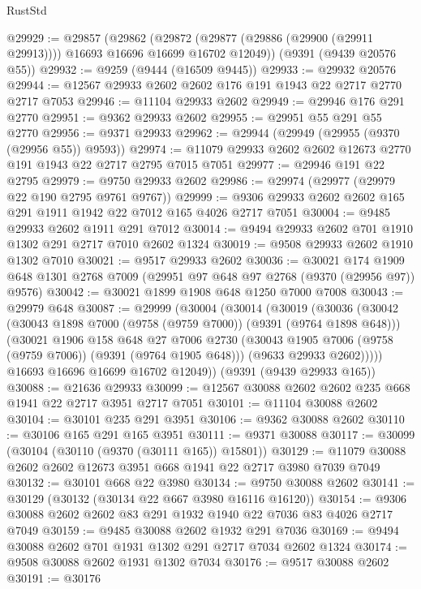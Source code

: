 \begin{lexlean}{RustStd}
\begin{coremodule}
@29929 := @29857
    (@29862 (@29872 (@29877 (@29886 (@29900 (@29911 @29913)))) @16693 @16696 @16699 @16702 @12049))
    (@9391 (@9439 @20576 @55))
@29932 := @9259 (@9444 (@16509 @9445))
@29933 := @29932 @20576
@29944 := @12567 @29933 @2602 @2602 @176 @191 @1943 @22 @2717 @2770 @2717 @7053
@29946 := @11104 @29933 @2602
@29949 := @29946 @176 @291 @2770
@29951 := @9362 @29933 @2602
@29955 := @29951 @55 @291 @55 @2770
@29956 := @9371 @29933
@29962 := @29944 (@29949 (@29955 (@9370 (@29956 @55)) @9593))
@29974 := @11079 @29933 @2602 @2602 @12673 @2770 @191 @1943 @22 @2717 @2795 @7015 @7051
@29977 := @29946 @191 @22 @2795
@29979 := @9750 @29933 @2602
@29986 := @29974 (@29977 (@29979 @22 @190 @2795 @9761 @9767))
@29999 := @9306 @29933 @2602 @2602 @165 @291 @1911 @1942 @22 @7012 @165 @4026 @2717 @7051
@30004 := @9485 @29933 @2602 @1911 @291 @7012
@30014 := @9494 @29933 @2602 @701 @1910 @1302 @291 @2717 @7010 @2602 @1324
@30019 := @9508 @29933 @2602 @1910 @1302 @7010
@30021 := @9517 @29933 @2602
@30036 := @30021
    @174
    @1909
    @648
    @1301
    @2768
    @7009
    (@29951 @97 @648 @97 @2768 (@9370 (@29956 @97)) @9576)
@30042 := @30021 @1899 @1908 @648 @1250 @7000 @7008
@30043 := @29979 @648
@30087 := @29999
    (@30004
      (@30014
        (@30019
          (@30036
            (@30042
              (@30043 @1898 @7000 (@9758 (@9759 @7000)) (@9391 (@9764 @1898 @648)))
              (@30021
                @1906
                @158
                @648
                @27
                @7006
                @2730
                (@30043 @1905 @7006 (@9758 (@9759 @7006)) (@9391 (@9764 @1905 @648)))
                (@9633 @29933 @2602)))))
        @16693
        @16696
        @16699
        @16702
        @12049))
    (@9391 (@9439 @29933 @165))
@30088 := @21636 @29933
@30099 := @12567 @30088 @2602 @2602 @235 @668 @1941 @22 @2717 @3951 @2717 @7051
@30101 := @11104 @30088 @2602
@30104 := @30101 @235 @291 @3951
@30106 := @9362 @30088 @2602
@30110 := @30106 @165 @291 @165 @3951
@30111 := @9371 @30088
@30117 := @30099 (@30104 (@30110 (@9370 (@30111 @165)) @15801))
@30129 := @11079 @30088 @2602 @2602 @12673 @3951 @668 @1941 @22 @2717 @3980 @7039 @7049
@30132 := @30101 @668 @22 @3980
@30134 := @9750 @30088 @2602
@30141 := @30129 (@30132 (@30134 @22 @667 @3980 @16116 @16120))
@30154 := @9306 @30088 @2602 @2602 @83 @291 @1932 @1940 @22 @7036 @83 @4026 @2717 @7049
@30159 := @9485 @30088 @2602 @1932 @291 @7036
@30169 := @9494 @30088 @2602 @701 @1931 @1302 @291 @2717 @7034 @2602 @1324
@30174 := @9508 @30088 @2602 @1931 @1302 @7034
@30176 := @9517 @30088 @2602
@30191 := @30176

\end{coremodule}
\end{lexlean}
